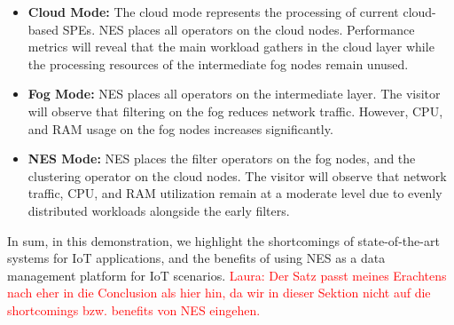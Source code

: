 \begin{itemize}
  \item \textbf{Cloud Mode:} The cloud mode represents the processing of current cloud-based SPEs. NES places all operators on the cloud nodes. Performance metrics will reveal that the main workload gathers in the cloud layer while the processing resources of the intermediate fog nodes remain unused.
  \item \textbf{Fog Mode:} NES places all operators on the intermediate layer. The visitor will observe that filtering on the fog reduces network traffic. However, CPU, and RAM usage on the fog nodes increases significantly.
  \item \textbf{NES Mode:} NES places the filter operators on the fog nodes, and the clustering operator on the cloud nodes. The visitor will observe that network traffic, CPU, and RAM utilization remain at a moderate level due to evenly distributed workloads alongside the early filters.
\end{itemize}

In sum, in this demonstration, we highlight the shortcomings of state-of-the-art systems for IoT applications, and the benefits of using NES as a data management platform for IoT scenarios. \textcolor{red}{Laura: Der Satz passt meines Erachtens nach eher in die Conclusion als hier hin, da wir in dieser Sektion nicht auf die shortcomings bzw. benefits von NES eingehen.}


